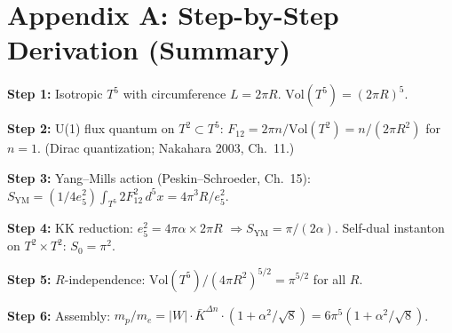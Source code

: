 \documentclass[11pt]{article}
\begin{document}
\section*{Appendix A: Step-by-Step Derivation (Summary)}

\textbf{Step 1:} Isotropic $T^5$ with circumference $L = 2\pi R$.
$\mathrm{Vol}(T^5) = (2\pi R)^5$.

\textbf{Step 2:} U(1) flux quantum on $T^2 \subset T^5$:
$F_{12} = 2\pi n / \mathrm{Vol}(T^2) = n/(2\pi R^2)$ for $n=1$.
(Dirac quantization; Nakahara 2003, Ch.~11.)

\textbf{Step 3:} Yang--Mills action (Peskin--Schroeder, Ch.~15):
$S_{\mathrm{YM}} = (1/4e_5^2) \int_{T^5} 2F_{12}^2\, d^5x = 4\pi^3 R / e_5^2$.

\textbf{Step 4:} KK reduction: $e_5^2 = 4\pi\alpha \times 2\pi R$
$\Rightarrow S_{\mathrm{YM}} = \pi/(2\alpha)$.
Self-dual instanton on $T^2 \times T^2$: $S_0 = \pi^2$.

\textbf{Step 5:} $R$-independence: $\mathrm{Vol}(T^5)/(4\pi R^2)^{5/2} = \pi^{5/2}$ for all $R$.

\textbf{Step 6:} Assembly: $m_p/m_e = |W| \cdot \bar{K}^{\Delta n} \cdot (1 + \alpha^2/\sqrt{8}) = 6\pi^5(1+\alpha^2/\sqrt{8})$.
\end{document}
